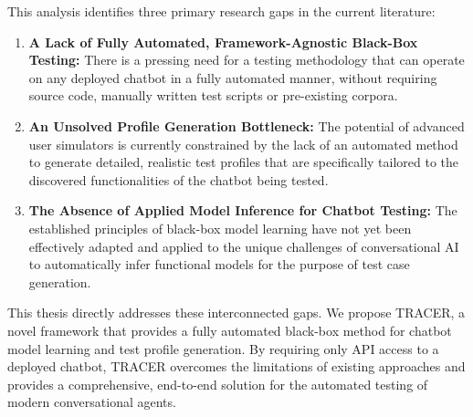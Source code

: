 This analysis identifies three primary research gaps in the current literature:
\begin{enumerate}
    \item \textbf{A Lack of Fully Automated, Framework-Agnostic Black-Box Testing:}
      There is a pressing need for a testing methodology
      that can operate on any deployed chatbot in a fully automated manner,
      without requiring source code, manually written test scripts or pre-existing corpora.

    \item \textbf{An Unsolved Profile Generation Bottleneck:}
      The potential of advanced user simulators
      is currently constrained by the lack of an automated method
      to generate detailed, realistic test profiles
      that are specifically tailored to the discovered functionalities
      of the chatbot being tested.

    \item \textbf{The Absence of Applied Model Inference for Chatbot Testing:}
      The established principles of black-box model learning
      have not yet been effectively adapted and applied
      to the unique challenges of conversational \ac{AI}
      to automatically infer functional models
      for the purpose of test case generation.
\end{enumerate}

This thesis directly addresses these interconnected gaps.
We propose \ac{TRACER}, a novel framework
that provides a fully automated black-box method
for chatbot model learning and test profile generation.
By requiring only \ac{API} access to a deployed chatbot,
\ac{TRACER} overcomes the limitations of existing approaches
and provides a comprehensive, end-to-end solution
for the automated testing of modern conversational agents.
